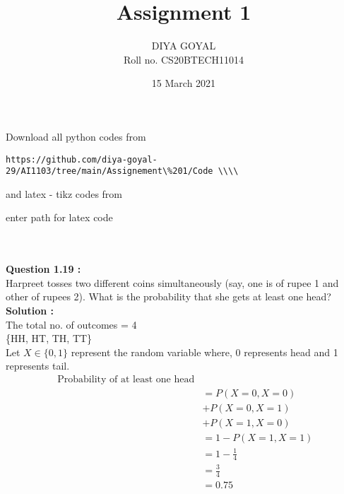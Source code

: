 \documentclass[journal,12pt,twocolumn]{IEEEtran}
\title{Assignment 1}
\author{DIYA GOYAL\\
Roll no. CS20BTECH11014}
\date{15 March 2021}
\begin{document}
\maketitle
\large Download all python codes from\\
\begin{lstlisting}
https://github.com/diya-goyal-29/AI1103/tree/main/Assignement\%201/Code \\\\
\end{lstlisting}
\large and latex - tikz codes from \\
\begin{tcolorbox}
enter path for latex code\\
\end{tcolorbox}
\\ \\
\large\textbf{Question 1.19 :} \\
Harpreet tosses two different coins simultaneously (say, one is of rupee 1 and other of rupees 2). What is the probability that she gets at least one head? \\
\large\textbf{Solution :}\\
The total no. of outcomes = 4\\ 
\{HH, HT, TH, TT\}\\
Let $X \in \{0 , 1\}$ represent the random variable where, 0 represents head and 1 represents tail.\\
\begin{equation*}
    \begin{split}
   \text{ Probability of at least one head}\\ &= P(X = 0, X = 0) \\&+ P(X = 0, X = 1) \\&+ P(X = 1, X = 0)\\
        & = 1 - P(X = 1, X = 1)\\ 
        & = 1 - \frac{1}{4}\\
        & = \frac{3}{4}\\
        & = 0.75\\
    \end{split}
\end{equation*}
\end{document}
